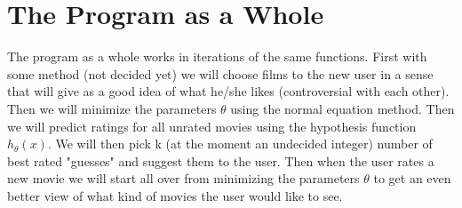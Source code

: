 \documentclass[a4paper, 12pt, finnish]{article}
\begin{document}
\section{The Program as a Whole}
The program as a whole works in iterations of the same functions. First with some method (not decided yet) we will choose films to the new user in a sense that will give as a good idea of what he/she likes (controversial with each other). Then we will minimize the parameters \(\theta\) using the normal equation method. Then we will predict ratings for all unrated movies using the hypothesis function \(h_{\theta}(x)\). We will then pick k (at the moment an undecided integer) number of best rated "guesses" and suggest them to the user. Then when the user rates a new movie we will start all over from minimizing the parameters \(\theta\) to get an even better view of what kind of movies the user would like to see.
\end{document}
